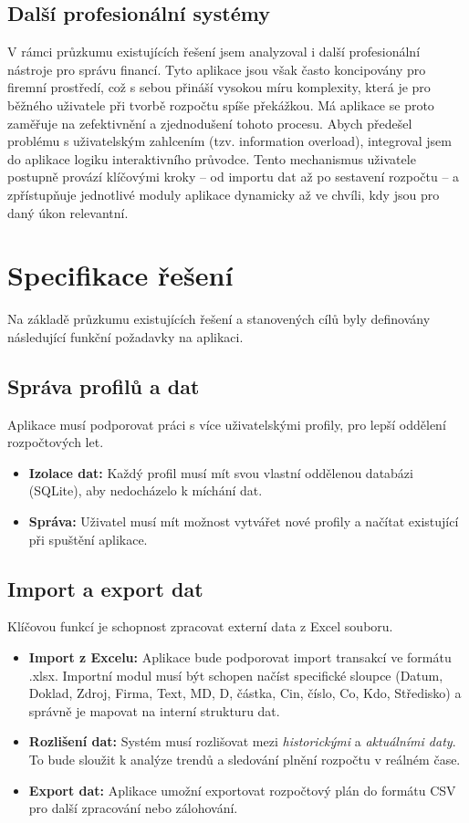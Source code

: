 \documentclass[
program=itk,
biblatex,
language=czech,
font=sans,
figures=true,
tables=false,
sourcecodes=false,
glossaries,
index
]{kidiplom}
\begin{document}
\subsection{Další profesionální systémy}
V rámci průzkumu existujících řešení jsem analyzoval i další profesionální nástroje pro správu financí. Tyto aplikace jsou však často koncipovány pro firemní prostředí, což s sebou přináší vysokou míru komplexity, která je pro běžného uživatele při tvorbě rozpočtu spíše překážkou. Má aplikace se proto zaměřuje na zefektivnění a zjednodušení tohoto procesu. Abych předešel problému s uživatelským zahlcením (tzv. information overload), integroval jsem do aplikace logiku interaktivního průvodce. Tento mechanismus uživatele postupně provází klíčovými kroky – od importu dat až po sestavení rozpočtu – a zpřístupňuje jednotlivé moduly aplikace dynamicky až ve chvíli, kdy jsou pro daný úkon relevantní.

\section{Specifikace řešení}
Na základě průzkumu existujících řešení a stanovených cílů byly definovány následující funkční požadavky na aplikaci.

\subsection{Správa profilů a dat}
Aplikace musí podporovat práci s více uživatelskými profily, pro lepší oddělení rozpočtových let.
\begin{itemize}
    \item \textbf{Izolace dat:} Každý profil musí mít svou vlastní oddělenou databázi (SQLite), aby nedocházelo k míchání dat.
    \item \textbf{Správa:} Uživatel musí mít možnost vytvářet nové profily a načítat existující při spuštění aplikace.
\end{itemize}

\subsection{Import a export dat}
Klíčovou funkcí je schopnost zpracovat externí data z Excel souboru.
\begin{itemize}
    \item \textbf{Import z Excelu:} Aplikace bude podporovat import transakcí ve formátu .xlsx. Importní modul musí být schopen načíst specifické sloupce (Datum, Doklad, Zdroj, Firma, Text, MD, D, částka, Cin, číslo, Co, Kdo, Středisko) a správně je mapovat na interní strukturu dat.
    \item \textbf{Rozlišení dat:} Systém musí rozlišovat mezi \textit{historickými} a \textit{aktuálními daty}. To bude sloužit k analýze trendů a sledování plnění rozpočtu v reálném čase.
    \item \textbf{Export dat:} Aplikace umožní exportovat rozpočtový plán do formátu CSV pro další zpracování nebo zálohování.
\end{itemize}
\end{document}
